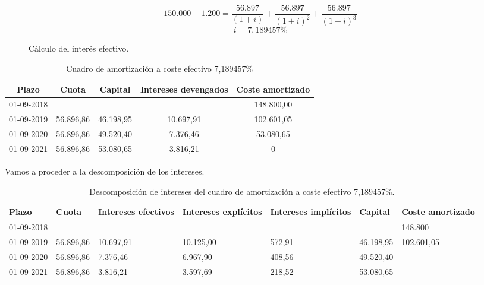 \begin{figure}[H]
    \centering
    \begin{equation*}
        150.000 - 1.200 = \frac{56.897}{(1+i)} + \frac{56.897}{(1+i)^2} + \frac{56.897}{(1+i)^3}
    \end{equation*}
    \begin{equation*}
        i = 7,189457\%
    \end{equation*}
    \caption{Cálculo del interés efectivo.}
    \label{fig:interes-efectivo}
\end{figure}

\begin{table}[h]
    \centering
    \begin{tabular}{ccccc}
        \toprule
        \textbf{Plazo} & \textbf{Cuota} & \textbf{Capital} & \textbf{Intereses devengados} & \textbf{Coste amortizado} \\
        \midrule
        01-09-2018 & & & & 148.800,00 \\
        01-09-2019 & 56.896,86 & 46.198,95 & 10.697,91 & 102.601,05 \\
        01-09-2020 & 56.896,86 & 49.520,40 & 7.376,46 & 53.080,65 \\
        01-09-2021 & 56.896,86 & 53.080,65 & 3.816,21 & 0 \\
        \bottomrule
    \end{tabular}
    \caption{Cuadro de amortización a coste efectivo 7,189457\%}
    \label{tab:amortizacion_7189}
\end{table}

Vamos a proceder a la descomposición de los intereses.

\begin{table}[H]
    \centering
    \begin{tabular}{|p{2cm}|p{2cm}|p{2cm}|p{2cm}|p{2cm}|p{2cm}|p{2cm}|}
        \hline
        \rowcolor{yellow!30}
        \textbf{Plazo} & \textbf{Cuota} & \textbf{Intereses efectivos} & \textbf{Intereses explícitos} & \textbf{Intereses implícitos} & \textbf{Capital} & \textbf{Coste amortizado}\\
        \hline
        01-09-2018 &&&&&&148.800\\
        \hline
        01-09-2019 & 56.896,86 & 10.697,91 & 10.125,00 & 572,91 & 46.198,95 & 102.601,05\\
        \hline
        01-09-2020 & 56.896,86 & 7.376,46 & 6.967,90 & 408,56 & 49.520,40 & \\
        \hline
        01-09-2021 & 56.896,86 & 3.816,21 & 3.597,69 & 218,52 & 53.080,65 & \\
        \hline
    \end{tabular}
    \caption{Descomposición de intereses del cuadro de amortización a coste efectivo 7,189457\%.}
    \label{tab:descomposicion_intereses}
\end{table}

